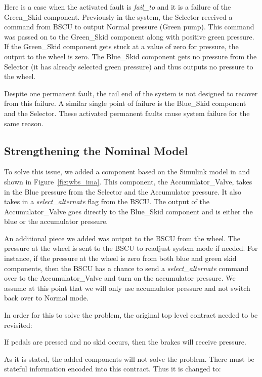 Here is a case when the activated fault is \textit{fail\_to} and it is a failure of the Green\_Skid component. Previously in the system, the Selector received a command from BSCU to output Normal pressure (Green pump). This command was passed on to the Green\_Skid component along with positive green pressure. If the Green\_Skid component gets stuck at a value of zero for pressure, the output to the wheel is zero. The Blue\_Skid component gets no pressure from the Selector (it has already selected green pressure) and thus outputs no pressure to the wheel.

Despite one permanent fault, the tail end of the system is not designed to recover from this failure. A similar single point of failure is the Blue\_Skid component and the Selector. These activated permanent faults cause system failure for the same reason.

\subsection{Strengthening the Nominal Model}
To solve this issue, we added a component based on the Simulink model in \cite{Joshi05:Dasc} and shown in Figure~\ref{fig:wbs_ima}. This component, the Accumulator\_Valve, takes in the Blue pressure from the Selector and the Accumulator pressure. It also takes in a \textit{select\_alternate} flag from the BSCU. The output of the Accumulator\_Valve goes directly to the Blue\_Skid component and is either the blue or the accumulator pressure.

An additional piece we added was output to the BSCU from the wheel. The pressure at the wheel is sent to the BSCU to readjust system mode if needed. For instance, if the pressure at the wheel is zero from both blue and green skid components, then the BSCU has a chance to send a \textit{select\_alternate} command over to the Accumulator\_Valve and turn on the accumulator pressure. We assume at this point that we will only use accumulator pressure and not switch back over to Normal mode.

In order for this to solve the problem, the original top level contract needed to be revisited:

\begin{tt}
If pedals are pressed and no skid occurs, then the brakes will receive pressure.
\end{tt}

As it is stated, the added components will not solve the problem. There must be stateful information encoded into this contract. Thus it is changed to:

